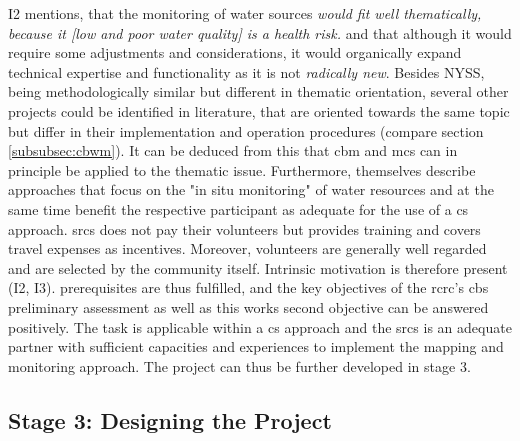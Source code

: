 I2 mentions, that the monitoring of water sources \textit{would fit well thematically, because it [low and poor water quality] is a health risk.} and that although it would require some adjustments and considerations, it would organically expand technical expertise and functionality as it is not \textit{radically new}. Besides NYSS, being methodologically similar but different in thematic orientation, several other projects could be identified in literature, that are oriented towards the same topic but differ in their implementation and operation procedures (compare section \ref*{subsubsec:cbwm}). It can be deduced from this that \acrshort{cbm} and \acrshort{mcs} can in principle be applied to the thematic issue. Furthermore, \autocite{fraislCitizenScienceEnvironmental2022} themselves describe approaches that focus on the "in situ monitoring" of water resources and at the same time benefit the respective participant as adequate for the use of a \acrlong{cs} approach. \acrshort{srcs} does not pay their volunteers but provides training and covers travel expenses as incentives. Moreover, volunteers are generally well regarded and are selected by the community itself. Intrinsic motivation is therefore present (I2, I3).\newline
\autocite{fraislCitizenScienceEnvironmental2022} prerequisites are thus fulfilled, and the key objectives of the \acrshort{rcrc}'s \acrshort{cbs} preliminary assessment as well as this works second objective can be answered positively. The task is applicable within a \acrshort{cs} approach and the \acrshort{srcs} is an adequate partner with sufficient capacities and experiences to implement the mapping and monitoring approach. The project can thus be further developed in stage 3.

\subsection{Stage 3: Designing the Project}\label{subsec:stage3_appl}

